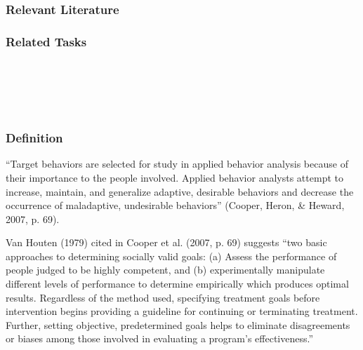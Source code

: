 \subsection{Relevant Literature}
\begin{refsection}
\nocite{test,alang2017police,clayton2018black}
\printbibliography[heading=none]
\end{refsection}
\subsection{Related Tasks}
\fourdOne{}\\
\fouriSeven{}\\
\fourjFour{}\\
%
%
%
%
%
%
%
\chapter{\foursecj{}}
\section[\fourjOne{}]{\fourjOne{}%
              }
\subsection{Definition}
``Target behaviors are selected for study in applied behavior analysis because of their importance to the people involved. Applied behavior analysts attempt to increase, maintain, and generalize adaptive, desirable behaviors and decrease the occurrence of maladaptive, undesirable behaviors'' (Cooper, Heron, \& Heward, 2007, p. 69).

Van Houten (1979) cited in Cooper et al. (2007, p. 69) suggests ``two basic approaches to determining socially valid goals: (a) Assess the performance of people judged to be highly competent, and (b) experimentally manipulate different levels of performance to determine empirically which produces optimal results. Regardless of the method used, specifying treatment goals before intervention begins providing a guideline for continuing or terminating treatment. Further, setting objective, predetermined goals helps to eliminate disagreements or biases among those involved in evaluating a program's effectiveness.''
%
